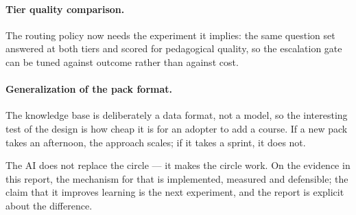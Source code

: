 \paragraph{Tier quality comparison.} The routing policy now needs the experiment it implies:
the same question set answered at both tiers and scored for pedagogical quality, so the
escalation gate can be tuned against outcome rather than against cost.

\paragraph{Generalization of the pack format.} The knowledge base is deliberately a data
format, not a model, so the interesting test of the design is how cheap it is for an
adopter to add a course. If a new pack takes an afternoon, the approach scales; if it takes
a sprint, it does not.

\begin{keyfinding}[Closing]
The AI does not replace the circle --- it makes the circle work. On the evidence in this
report, the mechanism for that is implemented, measured and defensible; the claim that it
improves learning is the next experiment, and the report is explicit about the difference.
\end{keyfinding}

